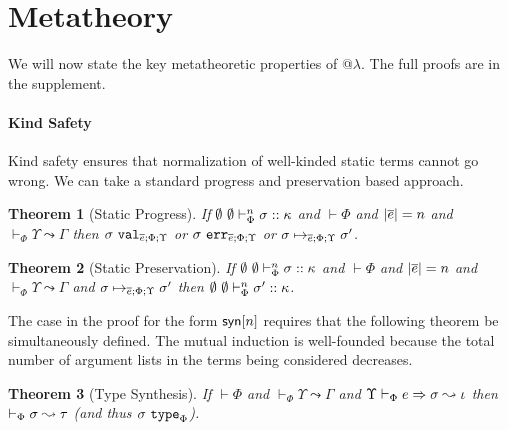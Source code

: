\documentclass[10pt,preprint]{sigplanconf}
\newtheorem{theorem}{Theorem}
\newtheorem{lemma}{Lemma}
\begin{document}


\section{Metatheory}\label{metatheory}
We will now state the key metatheoretic properties of @$\lambda$. The full proofs are in the supplement. 

\paragraph{Kind Safety} Kind safety ensures that normalization of well-kinded static terms cannot go wrong. We can take a standard progress and preservation based approach. 
\begin{theorem}[Static Progress]
If $\emptyset~\emptyset \vdash_{\Phi}^{n} \sigma :: \kappa$ and $\vdash \Phi$ and $|\overline{e}|=n$ and $\vdash_\Phi \Upsilon \leadsto \Gamma$ then $\sigma~\mathtt{val}_{\overline{e}; \Phi; \Upsilon}$ or $\sigma~\mathtt{err}_{\overline{e}; \Phi; \Upsilon}$ or $\sigma \mapsto_{\overline{e}; \Phi; \Upsilon} \sigma'$.
\end{theorem}

\begin{theorem}[Static Preservation]
If $\emptyset~\emptyset \vdash_{\Phi}^{n} \sigma :: \kappa$ and $\vdash \Phi$ and $|\overline{e}|=n$ and $\vdash_\Phi \Upsilon \leadsto \Gamma$ and $\sigma \mapsto_{\overline{e}; \Phi; \Upsilon} \sigma'$ then $\emptyset~\emptyset \vdash_{\Phi}^{n} \sigma' :: \kappa$.
\end{theorem}
The case in the proof for the form ${\sf syn}[n]$ requires that the following theorem be simultaneously defined. The mutual induction is well-founded because the total number of argument lists in the terms being considered decreases.
\begin{theorem}[Type Synthesis]
If $\vdash \Phi$ and $\vdash_\Phi \Upsilon \leadsto \Gamma$ and $\Upsilon \vdash_{\Phi} e \Rightarrow \sigma \leadsto \iota$ then $\vdash_\Phi \sigma \leadsto \tau$ (and thus $\sigma~\texttt{type}_{\Phi}$). 
\end{theorem}
\end{document}
